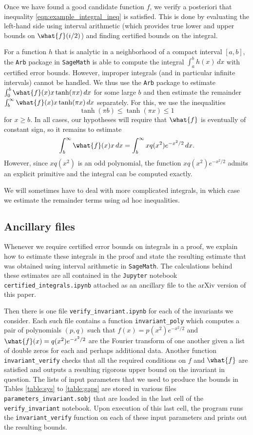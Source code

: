 \documentclass[12pt]{amsart}
\numberwithin{equation}{section}
\begin{document}
Once we have found a good candidate function $f$, we verify a posteriori that inequality \eqref{eqn:example_integral_ineq} is satisfied. This is done by evaluating the left-hand side using interval arithmetic (which provides true lower and upper bounds on $\what{f}(i/2)$) and finding certified bounds on the integral.

For a function $h$ that is analytic in a neighborhood of a compact interval $[a,b]$, the \texttt{Arb} package \cite{Johansson} in \texttt{SageMath} \cite{sagemath} is able to compute the integral $\int_a^b h(x)\,dx$ with certified error bounds. However, improper integrals (and in particular infinite intervals) cannot be handled. We thus use the \texttt{Arb} package to estimate $\int_0^b \what{f}(x) x\tanh(\pi x) \, dx$ for some large $b$ and then estimate the remainder $\int_b^\infty \what{f}(x) x\tanh(\pi x) \, dx$ separately. For this, we use the inequalities 
\[
\tanh(\pi b) \leq \tanh(\pi x) \leq 1
\] for $x\geq b$. In all cases, our hypotheses will require that $\what{f}$ is eventually of constant sign, so it remains to estimate
\[
\int_b^\infty \what{f}(x) x \, dx = \int_b^\infty x q(x^2)e^{-x^2/2} \, dx.
\]
However, since $xq(x^2)$ is an odd polynomial, the function $x q(x^2)e^{-x^2/2}$ admits an explicit primitive and the integral can be computed exactly.

We will sometimes have to deal with more complicated integrals, in which case we estimate the remainder terms using ad hoc inequalities.

\subsection{Ancillary files}

Whenever we require certified error bounds on integrals in a proof, we explain how to estimate these integrals in the proof and state the resulting estimate that was obtained using interval arithmetic in \texttt{SageMath}. The calculations behind these estimates are all contained in the \texttt{Jupyter} notebook \texttt{certified\_integrals.ipynb} attached as an ancillary file to the arXiv version of this paper.

Then there is one file \texttt{verify\_invariant.ipynb} for each of the invariants we consider. Each such file contains a function \texttt{invariant\_poly} which computes a pair of poly\-no\-mials $(p,q)$ such that $f(x)=p(x^2)e^{-x^2/2}$ and $\what{f}(x)=q(x^2)e^{-x^2/2}$ are the Fourier transform of one another given a list of double zeros for each and perhaps additional data. Another function \texttt{invariant\_verify} checks that all the required conditions on $f$ and $\what{f}$ are satisfied and outputs a resulting rigorous upper bound on the invariant in question. The lists of input parameters that we used to produce the bounds in Tables \ref{table:sys} to \ref{table:gaps} are stored in various files \texttt{parameters\_invariant.sobj} that are loaded in the last cell of the \texttt{verify\_invariant} notebook. Upon execution of this last cell, the program runs the \texttt{invariant\_verify} function on each of these input parameters and prints out the resulting bounds.
\end{document}
